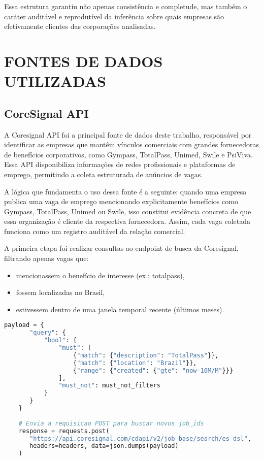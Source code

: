 Essa estrutura garantiu não apenas consistência e completude, mas também o caráter auditável e reprodutível da inferência sobre quais empresas são efetivamente clientes das corporações analisadas.

\section{FONTES DE DADOS UTILIZADAS}

\subsection{\textbf{CoreSignal API}}

A Coresignal API foi a principal fonte de dados deste trabalho, responsável por identificar as empresas que mantêm vínculos comerciais com grandes fornecedoras de benefícios corporativos, como Gympass, TotalPass, Unimed, Swile e PsiViva. Essa API disponibiliza informações de redes profissionais e plataformas de emprego, permitindo a coleta estruturada de anúncios de vagas.

A lógica que fundamenta o uso dessa fonte é a seguinte: quando uma empresa publica uma vaga de emprego mencionando explicitamente benefícios como Gympass, TotalPass, Unimed ou Swile, isso constitui evidência concreta de que essa organização é cliente da respectiva fornecedora. Assim, cada vaga coletada funciona como um registro auditável da relação comercial.

A primeira etapa foi realizar consultas ao endpoint de busca da Coresignal, filtrando apenas vagas que:
\begin{itemize}
    \item mencionassem o benefício de interesse (ex.: totalpass),
    \item fossem localizadas no Brasil,
    \item estivessem dentro de uma janela temporal recente (últimos meses).
\end{itemize}

\begin{lstlisting}[language=Python, caption={Consulta à API da Coresignal para coletar vagas}, label={lst:consulta-coresignal}]
    payload = {
       "query": {
           "bool": {
               "must": [
                   {"match": {"description": "TotalPass"}},
                   {"match": {"location": "Brazil"}},
                   {"range": {"created": {"gte": "now-10M/M"}}}
               ],
               "must_not": must_not_filters
           }
       }
    }
    
    # Envia a requisicao POST para buscar novos job_ids
    response = requests.post(
       "https://api.coresignal.com/cdapi/v2/job_base/search/es_dsl",
       headers=headers, data=json.dumps(payload)
    )
    \end{lstlisting}

